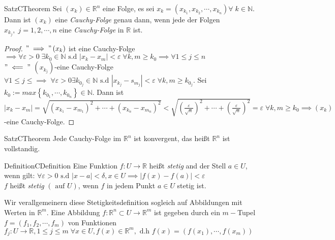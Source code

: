 \documentclass[a4paper]{memoir}
\begin{document}
\begin{ibox}[12]{Satz}{CTheorem}
    Sei $ \left( x_k \right) \in \mathbb{R}^n $ eine Folge, es sei $ x_k = \left( x_{k_{1}}, x_{k_{2}},\cdots, x_{k_{n}} \right) \forall \;
	k \in \mathbb{N}$. Dann ist $ \left( x_k \right)  $ eine \textit{Cauchy-Folge} genau dann, wenn jede der Folgen $ x_{k_{j}}, \; j = 1,2
	, \cdots ,n$ eine \textit{Cauchy-Folge} in $ \mathbb{R} $ ist.
\end{ibox}
\begin{proof}
	$ " \implies" \left( x_k \right)  $ ist eine Cauchy-Folge $ \implies \forall \varepsilon > 0 \; \exists k_0 \in \mathbb{N} \text{ s.d } 
	\left| x_k - x_m \right| < \varepsilon \; \forall k,m \geq k_0  \implies \forall  1 \leq j \leq n $  \\
	$ " \impliedby" $ $ \left( x_{k_{j}} \right)  $-eine Cauchy-Folge	$ \forall 1  \leq j \leq \implies \; \forall \varepsilon > 0
	\exists k_{0_{j}} \in \mathbb{N} \text{ s.d } \left| x_{k_{j}} - s_{m_{j}} \right| < \varepsilon \; \forall k,m \geq k_{0_{j}}$.
	Sei $ k_0 := max \left\{ k_{0_{1}}, \cdots, k_{0_{n}} \right\} \in \mathbb{N} $. Dann ist $ \left| x_k - x_m \right| = \sqrt{
	\left( x_{k_1} - x_{m_1} \right)^{2} + \cdots + \left( x_{k_n} - x_{m_n} \right)^{2}} <  
	\sqrt{\left( \frac{ \varepsilon}{\sqrt{n}} \right)^2 + \cdots +  \left( \frac{ \varepsilon}{\sqrt{n}} \right)^2} = \varepsilon \;
	\forall k, m \geq k_0 \implies \left( x_k \right)$-eine Cauchy-Folge.
\end{proof}

\begin{ibox}[13]{Satz}{CTheorem}
    Jede Cauchy-Folge im $ \mathbb{R}^n  $ ist konvergent, das heißt $ \mathbb{R}^n  $ ist vollstandig.
\end{ibox}


\begin{ibox}[]{Definition}{CDefinition}
    Eine Funktion $ f: U \to \mathbb{R}  $ heißt \textit{stetig} and der Stell $ a \in  U $, wenn gilt: $ \forall  \varepsilon >0 
	\text{ s.d } \left| x-a \right| < \delta, x \in  U \implies \left| f(x)-f(a) \right| < \varepsilon $\\
	$ f $ heißt \textit{stetig} $ \left( \text{ auf } U \right)  $, wenn $ f $ in jedem Punkt $ a \in  U $ stetig ist.
\end{ibox}
Wir verallgemeinern diese Stetigkeitsdefinition sogleich auf Abbildungen mit Werten in $ \mathbb{R}^m $. Eine Abbildung $ f : \mathbb{R}^n 
\subset U \to \mathbb{R}^m  $ ist gegeben durch ein $ m- $Tupel $ f = (f_1,f_2,\cdots, f_m) $ von Funktionen $ f_{j}: U \to \mathbb{R} 
, 1 \leq  j \leq m \; \forall  x \in  U, f(x) \in  \mathbb{R}^m, \text{ d.h } f(x) = \left( f(x_1), \cdots, f(x_m) \right) $ 
\end{document}
